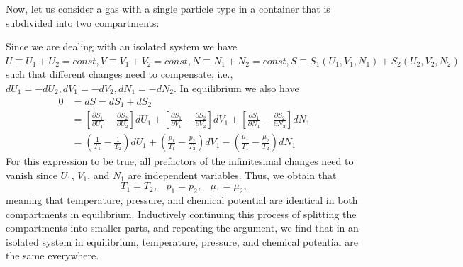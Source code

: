 \documentclass[12pt, a4paper, oneside, openright, titlepage]{book}
\begin{document}
Now, let us consider a gas with a single particle type in a container that is subdivided into two compartments:
\begin{center}
\end{center}
Since we are dealing with an isolated system we have $U \equiv U_1+U_2 = const, V \equiv V_1+V_2 = const, N \equiv N_1+N_2 = const, S \equiv S_1(U_1,V_1,N_1)+S_2(U_2,V_2,N_2)$ such that different changes need to compensate, i.e., $dU_1 = -dU_2, dV_1 = -dV_2, dN_1 = -dN_2$. In equilibrium we also have \begin{align*}
    0 &= dS = dS_1+dS_2 \\
    &= \left[\frac{\partial S_1}{\partial U_1}-\frac{\partial S_2}{\partial U_2}\right]dU_1+\left[\frac{\partial S_1}{\partial V_1} - \frac{\partial S_2}{\partial V_2}\right]dV_1 + \left[\frac{\partial S_1}{\partial N_1} - \frac{\partial S_2}{\partial N_2}\right]dN_1 \\
    &= \left(\frac{1}{T_1} - \frac{1}{T_2}\right)dU_1 + \left(\frac{p_1}{T_1} - \frac{p_2}{T_2}\right)dV_1 - \left(\frac{\mu_1}{T_1} - \frac{\mu_2}{T_2}\right)dN_1
\end{align*}
For this expression to be true, all prefactors of the infinitesimal changes need to vanish since $U_1$, $V_1$, and $N_1$ are independent variables. Thus, we obtain that \begin{equation*}
    T_1 = T_2,\;\;\;p_1 = p_2,\;\;\;\mu_1 = \mu_2,
\end{equation*}
meaning that temperature, pressure, and chemical potential are identical in both compartments in equilibrium. Inductively continuing this process of splitting the compartments into smaller parts, and repeating the argument, we find that in an isolated system in equilibrium, temperature, pressure, and chemical potential are the same everywhere.
\end{document}
